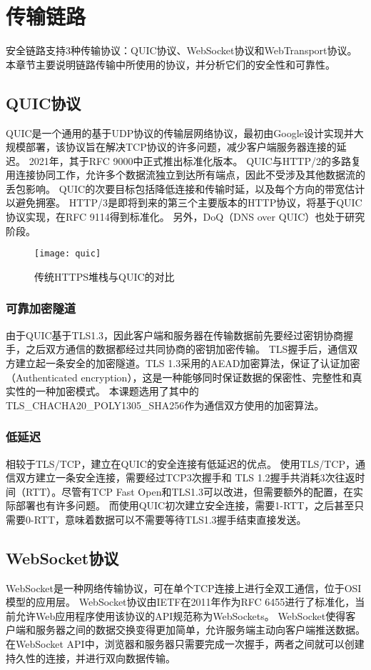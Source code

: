 \chapter{传输链路}
安全链路支持3种传输协议：QUIC协议、WebSocket协议和WebTransport协议。
本章节主要说明链路传输中所使用的协议，并分析它们的安全性和可靠性。

\section{QUIC协议}
QUIC是一个通用的基于UDP协议的传输层网络协议，最初由Google设计实现并大规模部署\cite{langley2017quic}，该协议旨在解决TCP协议的许多问题，减少客户端服务器连接的延迟。
2021年，其于RFC 9000\cite{rfc9000}中正式推出标准化版本。
QUIC与HTTP/2的多路复用连接协同工作，允许多个数据流独立到达所有端点，因此不受涉及其他数据流的丢包影响。
QUIC的次要目标包括降低连接和传输时延，以及每个方向的带宽估计以避免拥塞。
HTTP/3是即将到来的第三个主要版本的HTTP协议，将基于QUIC协议实现，在RFC 9114\cite{rfc9114}得到标准化。
另外，DoQ（DNS over QUIC）也处于研究阶段。

\begin{figure}[H]
  \centering
  \texttt{[image: quic]}
  \caption{传统HTTPS堆栈与QUIC的对比}
\end{figure}

\subsection{可靠加密隧道}
由于QUIC基于TLS1.3，因此客户端和服务器在传输数据前先要经过密钥协商握手，之后双方通信的数据都经过共同协商的密钥加密传输。
TLS握手后，通信双方建立起一条安全的加密隧道。TLS 1.3采用的AEAD加密算法，保证了认证加密（Authenticated encryption），这是一种能够同时保证数据的保密性、完整性和真实性的一种加密模式。
本课题选用了其中的TLS\_CHACHA20\_POLY1305\_SHA256作为通信双方使用的加密算法。

\subsection{低延迟}
相较于TLS/TCP，建立在QUIC的安全连接有低延迟的优点。
使用TLS/TCP，通信双方建立一条安全连接，需要经过TCP3次握手和
TLS 1.2握手共消耗3次往返时间（RTT）。尽管有TCP Fast Open\cite{radhakrishnan2011tcp}和TLS1.3可以改进，但需要额外的配置，在实际部署也有许多问题。
而使用QUIC初次建立安全连接，需要1-RTT，之后甚至只需要0-RTT，意味着数据可以不需要等待TLS1.3握手结束直接发送。

\section{WebSocket协议}
WebSocket是一种网络传输协议，可在单个TCP连接上进行全双工通信，位于OSI模型的应用层。
WebSocket协议由IETF在2011年作为RFC 6455\cite{rfc6455}进行了标准化，当前允许Web应用程序使用该协议的API规范称为WebSockets。
WebSocket使得客户端和服务器之间的数据交换变得更加简单，允许服务端主动向客户端推送数据。
在WebSocket API中，浏览器和服务器只需要完成一次握手，两者之间就可以创建持久性的连接，并进行双向数据传输。

